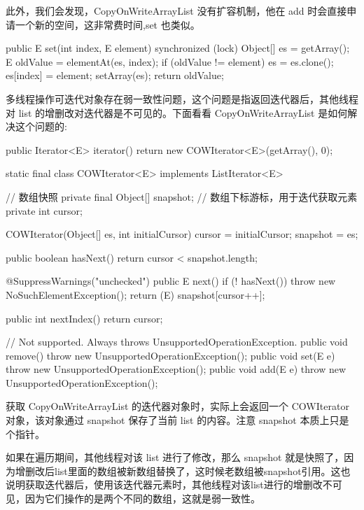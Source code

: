 此外，我们会发现，CopyOnWriteArrayList 没有扩容机制，他在 add 时会直接申请一个新的空间，这非常费时间,set 也类似。

\begin{Java}
public E set(int index, E element) {
    synchronized (lock) {
        Object[] es = getArray();
        E oldValue = elementAt(es, index);
        if (oldValue != element) {
            es = es.clone();
            es[index] = element;
        }
        setArray(es);
        return oldValue;
    }
}
\end{Java}

多线程操作可迭代对象存在弱一致性问题，这个问题是指返回迭代器后，其他线程对 list 的增删改对迭代器是不可见的。下面看看 CopyOnWriteArrayList 是如何解决这个问题的:

\begin{Java}
public Iterator<E> iterator() {
    return new COWIterator<E>(getArray(), 0);
}

static final class COWIterator<E> implements ListIterator<E> {
    // 数组快照
    private final Object[] snapshot;
    // 数组下标游标，用于迭代获取元素
    private int cursor;

    COWIterator(Object[] es, int initialCursor) {
        cursor = initialCursor;
        snapshot = es;
    }

    public boolean hasNext() {
        return cursor < snapshot.length;
    }

    @SuppressWarnings("unchecked")
    public E next() {
        if (! hasNext())
            throw new NoSuchElementException();
        return (E) snapshot[cursor++];
    }

    public int nextIndex() {
        return cursor;
    }

    // Not supported. Always throws UnsupportedOperationException.
    public void remove() {
        throw new UnsupportedOperationException();
    }
    public void set(E e) {
        throw new UnsupportedOperationException();
    }
    public void add(E e) {
        throw new UnsupportedOperationException();
    }
}
\end{Java}

获取 CopyOnWriteArrayList 的迭代器对象时，实际上会返回一个 COWIterator 对象，该对象通过 snapshot 保存了当前 list 的内容。注意 snapshot 本质上只是个指针。

如果在遍历期间，其他线程对该 list 进行了修改，那么 snapshot 就是快照了，因为增删改后list里面的数组被新数组替换了，这时候老数组被snapshot引用。这也说明获取迭代器后，使用该迭代器元素时，其他线程对该list进行的增删改不可见，因为它们操作的是两个不同的数组，这就是弱一致性。

